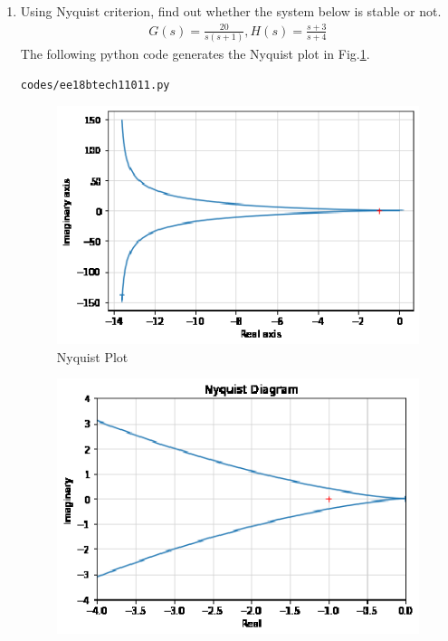 \begin{enumerate}[label=\thesubsection.\arabic*.,ref=\thesubsection.\theenumi]
\item Using Nyquist criterion, find out whether the system below is stable or not.
\begin{align}
\label{eq:ee18btech11011_system}
 G(s)=\frac{20}{s(s+1)} , 
 H(s)=\frac{s+3}{s+4}
\end{align}
\solution The following python code generates the Nyquist plot in Fig.\ref{fig:ee18btech11011}.
\begin{lstlisting}
codes/ee18btech11011.py
\end{lstlisting}
\begin{figure}[ht!]
  \includegraphics[width=\columnwidth]{./figs/ee18btech11011.eps}
  \caption{Nyquist Plot}
  \label{fig:ee18btech11011}
\end{figure}
\begin{figure}[ht!]
  \includegraphics[width=\columnwidth]{./figs/zoomed.eps}

\end{figure}
\end{enumerate}

